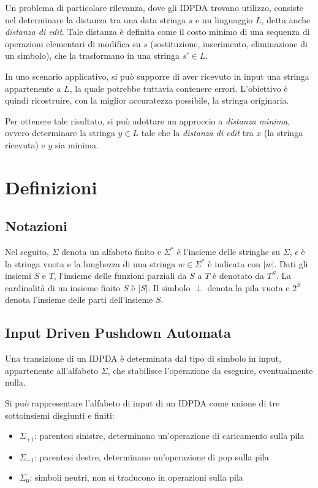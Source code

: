 \documentclass[a4paper,12pt]{report}
\theoremstyle{propositionstyle}
\begin{document}
    Un problema di particolare rilevanza, dove gli IDPDA trovano utilizzo, consiste nel determinare la distanza tra una data stringa $s$ e un linguaggio $L$, detta anche \textit{distanza di edit}.
    Tale distanza è definita come il costo minimo di una sequenza di operazioni elementari di modifica su $s$ (sostituzione, inserimento, eliminazione di un simbolo), che la trasformano in una stringa $s' \in L$.

    In uno scenario applicativo, si può supporre di aver ricevuto in input una stringa appartenente a $L$, la quale potrebbe tuttavia contenere errori.
    L'obiettivo è quindi ricostruire, con la miglior accuratezza possibile, la stringa originaria.

    Per ottenere tale risultato, si può adottare un approccio a \emph{distanza minima}, ovvero determinare la stringa $y \in L$ tale che la \textit{distanza di edit} tra $x$ (la stringa ricevuta) e $y$ sia minima.

    \chapter{Definizioni}

    \section{Notazioni}
    
    Nel seguito, $\Sigma$ denota un alfabeto finito e $\Sigma^*$ è l'insieme delle stringhe su $\Sigma$, $\epsilon$ è la stringa vuota e la lunghezza di una stringa $w \in \Sigma^*$ è indicata con $|w|$. Dati gli insiemi $S$ e $T$, l'insieme delle funzioni parziali da $S$ a $T$ è denotato da $T^S$. La cardinalità di un insieme finito $S$ è $|S|$. Il simbolo $\perp$ denota la pila vuota e $2^S$ denota l'insieme delle parti dell'insieme $S$.

    \section{Input Driven Pushdown Automata}

    Una transizione di un IDPDA è determinata dal tipo di simbolo in input, appartenente all'alfabeto $\Sigma$, che stabilisce l'operazione da eseguire, eventualmente nulla.
    
    Si può rappresentare l'alfabeto di input di un IDPDA come unione di tre sottoinsiemi disgiunti e finiti:

    \begin{itemize}
        \item $\Sigma_{+1}$: parentesi sinistre, determinano un'operazione di caricamento sulla pila
        \item $\Sigma_{-1}$: parentesi destre, determinano un'operazione di pop sulla pila
        \item $\Sigma_{0}$: simboli neutri, non si traducono in operazioni sulla pila
    \end{itemize}
\end{document}
